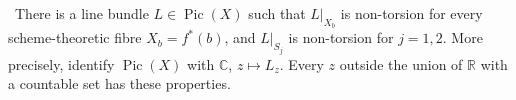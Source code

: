\begin{theorem}
\hypertarget{tag-03DQ}{}\label{wb:thm:uniform-nontorsion-audit}

\ There is a line bundle \(L\in\operatorname{Pic}(X)\) such that
\(L|_{X_b}\) is non-torsion for every scheme-theoretic fibre
\(X_b=f^*(b)\), and \(L|_{S_j}\) is non-torsion for \(j=1,2\).
More precisely, identify \(\operatorname{Pic}(X)\) with \(\mathbb C\),
\(z\mapsto L_z\).  Every \(z\) outside the union of \(\mathbb R\) with a
countable set has these properties.
\end{theorem}



